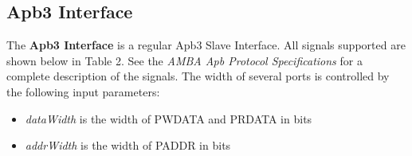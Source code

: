 \subsection{Apb3 Interface}
The \textbf{Apb3 Interface} is a regular Apb3 Slave Interface. All signals supported are shown below in 
Table 2. See the \textit{AMBA Apb Protocol Specifications} for a complete description of the signals. The width of several ports is controlled 
by the following input parameters:

\begin{itemize}[noitemsep]
  \item \textit{dataWidth} is the width of PWDATA and PRDATA in bits
  \item \textit{addrWidth} is the width of PADDR in bits
\end{itemize}
 
\renewcommand*{\arraystretch}{1.4}

